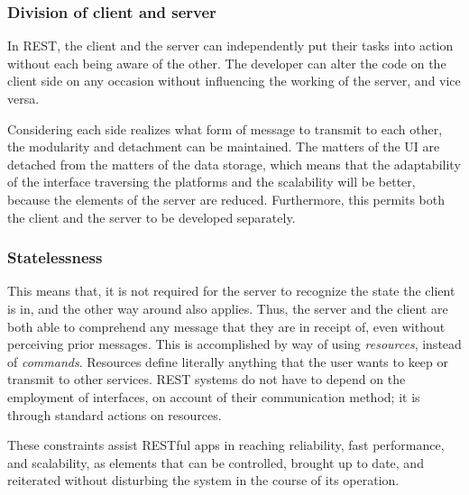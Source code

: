 \documentclass[a4paper, 11pt,openany]{book} %
\begin{document}
\subsubsection{Division of client and server}
In REST, the client and the server can independently put their tasks into action without each being aware of the other. The developer can alter the code on the client side on any occasion without influencing the working of the server, and vice versa.\par 
Considering each side realizes what form of message to transmit to each other, the modularity and detachment can be maintained. The matters of the UI are detached from the matters of the data storage, which means that the adaptability of the interface traversing the platforms and the scalability will be better, because the elements of the server are reduced. Furthermore, this permits both the client and the server to be developed separately.
\subsubsection{Statelessness}
This means that, it is not required for the server to recognize the state the client is in, and the other way around also applies. Thus, the server and the client are both able to comprehend any message that they are in receipt of, even without perceiving prior messages. This is accomplished by way of using \textit{resources}, instead of \textit{commands}. Resources define literally anything that the user wants to keep or transmit to other services. REST systems do not have to depend on the employment of interfaces, on account of their communication method; it is through standard actions on resources. \par 
These constraints assist RESTful apps in reaching reliability, fast performance, and scalability, as elements that can be controlled, brought up to date, and reiterated without disturbing the system in the course of its operation.
\end{document}
